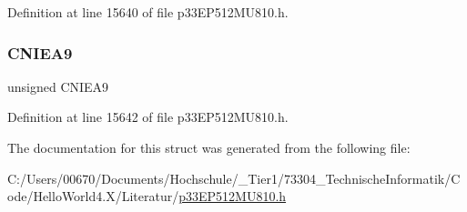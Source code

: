 Definition at line 15640 of file p33\+E\+P512\+M\+U810.\+h.

\mbox{\label{structtag_c_n_e_n_a_b_i_t_s_a093cbe224a5d505224829a0e1467c9a1}} 
\subsubsection{\texorpdfstring{C\+N\+I\+E\+A9}{CNIEA9}}
{\footnotesize\ttfamily unsigned C\+N\+I\+E\+A9}



Definition at line 15642 of file p33\+E\+P512\+M\+U810.\+h.



The documentation for this struct was generated from the following file\+:\begin{DoxyCompactItemize}
\item 
C\+:/\+Users/00670/\+Documents/\+Hochschule/\+\_\+\+Tier1/73304\+\_\+\+Technische\+Informatik/\+Code/\+Hello\+World4.\+X/\+Literatur/\hyperlink{p33_e_p512_m_u810_8h}{p33\+E\+P512\+M\+U810.\+h}\end{DoxyCompactItemize}
